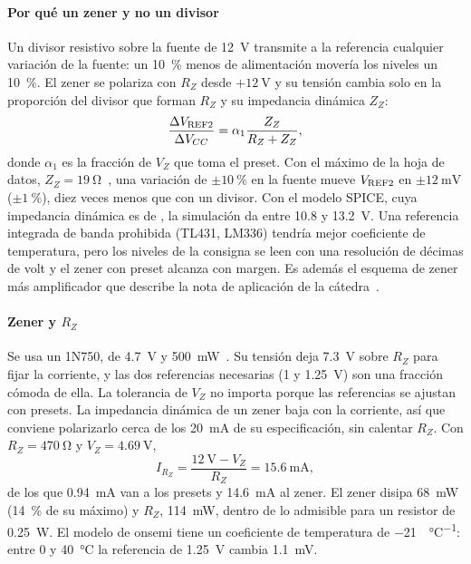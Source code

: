 \paragraph*{Por qué un zener y no un divisor} Un divisor resistivo sobre la fuente de \SI{12}{\volt} transmite a la referencia cualquier variación de la fuente: un \SI{10}{\percent} menos de alimentación movería los niveles un \SI{10}{\percent}. El zener se polariza con $R_Z$ desde $+\SI{12}{\volt}$ y su tensión cambia solo en la proporción del divisor que forman $R_Z$ y su impedancia dinámica $Z_Z$:
\begin{equation}
\frac{\Delta V_{\mathrm{REF2}}}{\Delta V_{CC}} = \alpha_1 \frac{Z_Z}{R_Z + Z_Z},
\end{equation}
donde $\alpha_1$ es la fracción de $V_Z$ que toma el preset. Con el máximo de la hoja de datos, $Z_Z = \SI{19}{\ohm}$~\cite{1n750}, una variación de $\pm\SI{10}{\percent}$ en la fuente mueve $V_{\mathrm{REF2}}$ en $\pm\SI{12}{\milli\volt}$ ($\pm\SI{1}{\percent}$), diez veces menos que con un divisor. Con el modelo SPICE, cuya impedancia dinámica es de , la simulación da  entre \SI{10,8}{} y \SI{13,2}{\volt}. Una referencia integrada de banda prohibida (TL431, LM336) tendría mejor coeficiente de temperatura, pero los niveles de la consigna se leen con una resolución de décimas de volt y el zener con preset alcanza con margen. Es además el esquema de zener más amplificador que describe la nota de aplicación de la cátedra~\cite{refs}.

\paragraph*{Zener y $R_Z$} Se usa un 1N750, de \SI{4,7}{\volt} y \SI{500}{\milli\watt}~\cite{1n750}. Su tensión deja \SI{7,3}{\volt} sobre $R_Z$ para fijar la corriente, y las dos referencias necesarias (\SI{1}{} y \SI{1,25}{\volt}) son una fracción cómoda de ella. La tolerancia de $V_Z$ no importa porque las referencias se ajustan con presets. La impedancia dinámica de un zener baja con la corriente, así que conviene polarizarlo cerca de los \SI{20}{\milli\ampere} de su especificación, sin calentar $R_Z$. Con $R_Z = \SI{470}{\ohm}$ y $V_Z = \SI{4,69}{\volt}$,
\begin{equation}
I_{R_Z} = \frac{\SI{12}{\volt} - V_Z}{R_Z} = \SI{15,6}{\milli\ampere},
\end{equation}
de los que \SI{0,94}{\milli\ampere} van a los presets y \SI{14,6}{\milli\ampere} al zener. El zener disipa \SI{68}{\milli\watt} (\SI{14}{\percent} de su máximo) y $R_Z$, \SI{114}{\milli\watt}, dentro de lo admisible para un resistor de \SI{0,25}{\watt}. El modelo de onsemi tiene un coeficiente de temperatura de \SI{-21}{\ppm\per\celsius}: entre \SI{0}{} y \SI{40}{\celsius} la referencia de \SI{1,25}{\volt} cambia \SI{1,1}{\milli\volt}.


